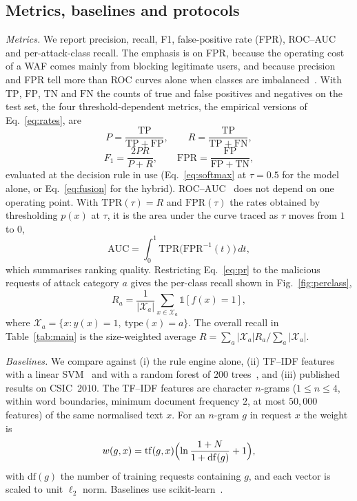 \documentclass[preprint,11pt]{elsarticle}
\begin{document}
\subsection{Metrics, baselines and protocols}
\emph{Metrics.} We report precision, recall, F1, false-positive rate (FPR),
ROC--AUC and per-attack-class recall. The emphasis is on FPR, because the
operating cost of a WAF comes mainly from blocking legitimate users, and
because precision and FPR tell more than ROC curves alone when classes are
imbalanced~\cite{he2009imbalanced,saito2015pr}. With
$\mathrm{TP}$, $\mathrm{FP}$, $\mathrm{TN}$ and $\mathrm{FN}$ the counts of
true and false positives and negatives on the test set, the four
threshold-dependent metrics, the empirical versions of
Eq.~\eqref{eq:rates}, are
\begin{equation}
P=\frac{\mathrm{TP}}{\mathrm{TP}+\mathrm{FP}}, \qquad
R=\frac{\mathrm{TP}}{\mathrm{TP}+\mathrm{FN}},
\label{eq:pr}
\end{equation}
\begin{equation}
F_1=\frac{2PR}{P+R}, \qquad
\mathrm{FPR}=\frac{\mathrm{FP}}{\mathrm{FP}+\mathrm{TN}},
\label{eq:f1fpr}
\end{equation}
evaluated at the decision rule in use (Eq.~\eqref{eq:softmax} at
$\tau=0.5$ for the model alone, or Eq.~\eqref{eq:fusion} for the hybrid).
ROC--AUC~\cite{fawcett2006roc} does not depend on one operating point. With
$\mathrm{TPR}(\tau)=R$ and $\mathrm{FPR}(\tau)$ the rates obtained by
thresholding $p(x)$ at $\tau$, it is the area under the curve traced as
$\tau$ moves from $1$ to $0$,
\begin{equation}
\mathrm{AUC} = \int_0^1 \mathrm{TPR}\bigl(\mathrm{FPR}^{-1}(t)\bigr)\,dt,
\label{eq:auc}
\end{equation}
which summarises ranking quality. Restricting Eq.~\eqref{eq:pr} to the
malicious requests of attack category $a$ gives the per-class recall shown
in Fig.~\ref{fig:perclass},
\begin{equation}
R_a = \frac{1}{|\mathcal{X}_a|}\sum_{x\in\mathcal{X}_a} \mathbb{1}[f(x)=1],
\label{eq:perclass}
\end{equation}
where $\mathcal{X}_a=\{x : y(x)=1,\ \mathrm{type}(x)=a\}$. The overall
recall in Table~\ref{tab:main} is the size-weighted average
$R=\sum_a |\mathcal{X}_a| R_a / \sum_a |\mathcal{X}_a|$.

\emph{Baselines.} We compare against (i) the rule engine alone, (ii)
TF--IDF features with a linear SVM~\cite{cortes1995svm} and with a random
forest of $200$ trees~\cite{breiman2001rf}, and (iii) published results on
CSIC~2010. The TF--IDF features are character $n$-grams ($1\le n\le4$,
within word boundaries, minimum document frequency $2$, at most $50{,}000$
features) of the same normalised text $x$. For an $n$-gram $g$ in request
$x$ the weight is
\begin{equation}
w(g,x)=\mathrm{tf}(g,x)\Bigl(\ln\frac{1+N}{1+\mathrm{df}(g)}+1\Bigr),
\label{eq:tfidf}
\end{equation}
with $\mathrm{df}(g)$ the number of training requests containing $g$, and
each vector is scaled to unit $\ell_2$ norm. Baselines use
scikit-learn~\cite{pedregosa2011sklearn}.
\end{document}
